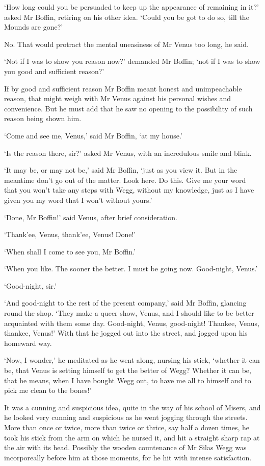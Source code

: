 ‘How long could you be persuaded to keep up the appearance of remaining
in it?’ asked Mr Boffin, retiring on his other idea. ‘Could you be got
to do so, till the Mounds are gone?’

No. That would protract the mental uneasiness of Mr Venus too long, he
said.

‘Not if I was to show you reason now?’ demanded Mr Boffin; ‘not if I was
to show you good and sufficient reason?’

If by good and sufficient reason Mr Boffin meant honest and
unimpeachable reason, that might weigh with Mr Venus against his
personal wishes and convenience. But he must add that he saw no opening
to the possibility of such reason being shown him.

‘Come and see me, Venus,’ said Mr Boffin, ‘at my house.’

‘Is the reason there, sir?’ asked Mr Venus, with an incredulous smile
and blink.

‘It may be, or may not be,’ said Mr Boffin, ‘just as you view it. But
in the meantime don’t go out of the matter. Look here. Do this. Give me
your word that you won’t take any steps with Wegg, without my knowledge,
just as I have given you my word that I won’t without yours.’

‘Done, Mr Boffin!’ said Venus, after brief consideration.

‘Thank’ee, Venus, thank’ee, Venus! Done!’

‘When shall I come to see you, Mr Boffin.’

‘When you like. The sooner the better. I must be going now. Good-night,
Venus.’

‘Good-night, sir.’

‘And good-night to the rest of the present company,’ said Mr Boffin,
glancing round the shop. ‘They make a queer show, Venus, and I should
like to be better acquainted with them some day. Good-night, Venus,
good-night! Thankee, Venus, thankee, Venus!’ With that he jogged out
into the street, and jogged upon his homeward way.

‘Now, I wonder,’ he meditated as he went along, nursing his stick,
‘whether it can be, that Venus is setting himself to get the better of
Wegg? Whether it can be, that he means, when I have bought Wegg out, to
have me all to himself and to pick me clean to the bones!’

It was a cunning and suspicious idea, quite in the way of his school
of Misers, and he looked very cunning and suspicious as he went jogging
through the streets. More than once or twice, more than twice or thrice,
say half a dozen times, he took his stick from the arm on which he
nursed it, and hit a straight sharp rap at the air with its head.
Possibly the wooden countenance of Mr Silas Wegg was incorporeally
before him at those moments, for he hit with intense satisfaction.

